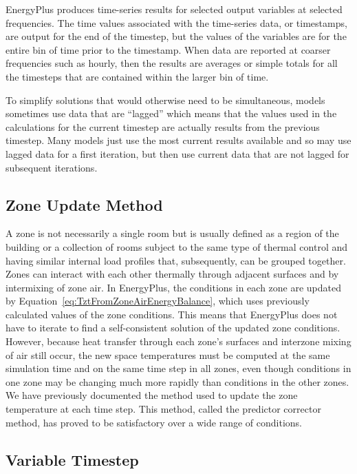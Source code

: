 EnergyPlus produces time-series results for selected output variables at selected frequencies. The time values associated with the time-series data, or timestamps, are output for the end of the timestep, but the values of the variables are for the entire bin of time prior to the timestamp. When data are reported at coarser frequencies such as hourly, then the results are averages or simple totals for all the timesteps that are contained within the larger bin of time.

To simplify solutions that would otherwise need to be simultaneous, models sometimes use data that are ``lagged'' which means that the values used in the calculations for the current timestep are actually results from the previous timestep. Many models just use the most current results available and so may use lagged data for a first iteration, but then use current data that are not lagged for subsequent iterations.

\subsection{Zone Update Method}\label{zone-update-method}

A zone is not necessarily a single room but is usually defined as a region of the building or a collection of rooms subject to the same type of thermal control and having similar internal load profiles that, subsequently, can be grouped together. Zones can interact with each other thermally through adjacent surfaces and by intermixing of zone air. In EnergyPlus, the conditions in each zone are updated by Equation~\ref{eq:TztFromZoneAirEnergyBalance}, which uses previously calculated values of the zone conditions. This means that EnergyPlus does not have to iterate to find a self-consistent solution of the updated zone conditions. However, because heat transfer through each zone's surfaces and interzone mixing of air still occur, the new space temperatures must be computed at the same simulation time and on the same time step in all zones, even though conditions in one zone may be changing much more rapidly than conditions in the other zones. We have previously documented the method used to update the zone temperature at each time step. This method, called the predictor corrector method, has proved to be satisfactory over a wide range of conditions.

\subsection{Variable Timestep}\label{variable-timestep}

